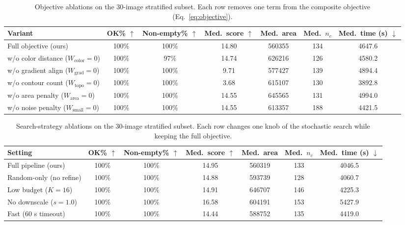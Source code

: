 \documentclass[11pt,a4paper]{article}
\begin{document}
\begin{table}[t]
\centering
\caption{Objective ablations on the 30-image stratified subset. Each row removes one term from the composite objective (Eq.~\ref{eq:objective}).}
\label{tab:abl_obj}
\begin{tabular}{lcccccc}
\toprule
Variant & OK\% $\uparrow$ & Non-empty\% $\uparrow$ & Med.\ score $\uparrow$ & Med.\ area & Med.\ $n_c$ & Med.\ time (s) $\downarrow$ \\
\midrule
Full objective (ours) & 100\% & 100\% & 14.80 & 560355 & 134 & 4647.6 \\
w/o color distance ($W_{\mathrm{color}}{=}0$) & 100\% & 97\% & 14.74 & 626216 & 126 & 4580.2 \\
w/o gradient align ($W_{\mathrm{grad}}{=}0$) & 100\% & 100\% & 9.71 & 577427 & 139 & 4894.4 \\
w/o contour count ($W_{\text{topo}}{=}0$) & 100\% & 100\% & 3.68 & 615107 & 130 & 3892.8 \\
w/o area penalty ($W_{\text{area}}{=}0$) & 100\% & 100\% & 14.55 & 645565 & 131 & 4994.0 \\
w/o noise penalty ($W_{\text{small}}{=}0$) & 100\% & 100\% & 14.55 & 613357 & 188 & 4421.5 \\
\bottomrule
\end{tabular}
\end{table}

\begin{table}[t]
\centering
\caption{Search-strategy ablations on the 30-image stratified subset. Each row changes one knob of the stochastic search while keeping the full objective.}
\label{tab:abl_search}
\begin{tabular}{lcccccc}
\toprule
Setting & OK\% $\uparrow$ & Non-empty\% $\uparrow$ & Med.\ score $\uparrow$ & Med.\ area & Med.\ $n_c$ & Med.\ time (s) $\downarrow$ \\
\midrule
Full pipeline (ours) & 100\% & 100\% & 14.95 & 560319 & 133 & 4046.5 \\
Random-only (no refine) & 100\% & 100\% & 14.88 & 593739 & 128 & 4060.7 \\
Low budget ($K{=}16$) & 100\% & 100\% & 14.91 & 646707 & 146 & 4225.3 \\
No downscale ($s{=}1.0$) & 100\% & 100\% & 16.58 & 604191 & 153 & 5427.9 \\
Fast (60 s timeout) & 100\% & 100\% & 14.44 & 588752 & 135 & 4419.0 \\
\bottomrule
\end{tabular}
\end{table}
\end{document}
